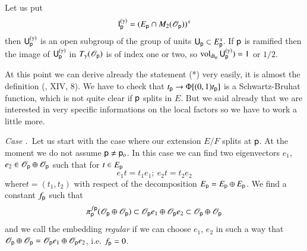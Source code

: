 Let us put
$$
\mathsf{I}^{(\gamma)}_{\mathsf{p}}=(E_{\mathsf{p}}\cap M_{2}(\mathscr{O}_{\mathsf{p}}))^{x}
$$
then $\mathsf{U}^{(\gamma)}_{\mathsf{p}}$ is an open subgroup of the group of units $\mathsf{U}_{\mathsf{p}}\subset E^{x}_{\mathsf{p}}$. If $\mathsf{p}$ is ramified then the image of $\mathsf{U}^{(\gamma)}_{\mathsf{p}}$ in $T_{\gamma}(\mathscr{O}_{\mathsf{p}})$ is of index one or two, so $\operatorname{vol}_{\operatorname{dt}_{\mathsf{p}}}\mathsf{U}^{(\gamma)}_{\mathsf{p}})=1$ or $1/2$.

\begin{remark*}
At this point we can derive already the statement (*) very easily, it is almost the definition (\cite{art2-key12}, XIV, 8). We have to check that $t_{\mathsf{p}}\to \Phi[(0,1)t_{\mathsf{p}}]$ is a Schwartz-Bruhat function, which is not quite clear if $\mathsf{p}$ splits in $E$. But we said already that we are interested in very specific informations on the local factors so we have to work a little more.
\end{remark*}

\medskip
\noindent
{\em Case .\label{art2-case1}}~Let us start with the case where our extension $E/F$ splits at $\mathsf{p}$. At the moment we do not assume $\mathsf{p}\neq \mathsf{p}_{o}$. In this case we can find two eigenvectors $e_{1}$, $e_{2}\in \mathscr{O}_{\mathsf{p}}\oplus \mathscr{O}_{\mathsf{p}}$ such that for $t\in E_{\mathsf{p}}$
$$
e_{1}t=t_{1}e_{1}; \ e_{2}t=t_{2}e_{2}
$$
where\pageoriginale $t=(t_{1},t_{2})$ with respect of the decomposition $E_{\mathsf{p}}=E_{\mathsf{p}}\oplus E_{\mathsf{p}}$. We find a constant $f_{\mathsf{p}}$ such that
$$
\pi^{f\mathsf{p}}_{\mathsf{p}}(\mathscr{O}_{\mathsf{p}}\oplus \mathscr{O}_{\mathsf{p}})\subset \mathscr{O}_{\mathsf{p}}e_{1}\oplus\mathscr{O}_{\mathsf{p}}e_{2}\subset \mathscr{O}_{\mathsf{p}}\oplus \mathscr{O}_{\mathsf{p}}
$$
and we call the embedding {\em regular} if we can choose $e_{1}$, $e_{2}$ in such a way that $\mathscr{O}_{\mathsf{p}}\oplus \mathscr{O}_{\mathsf{p}}=\mathscr{O}_{\mathsf{p}}e_{1}\oplus \mathscr{O}_{\mathsf{p}}e_{2}$, i.e. $f_{\mathsf{p}}=0$.

